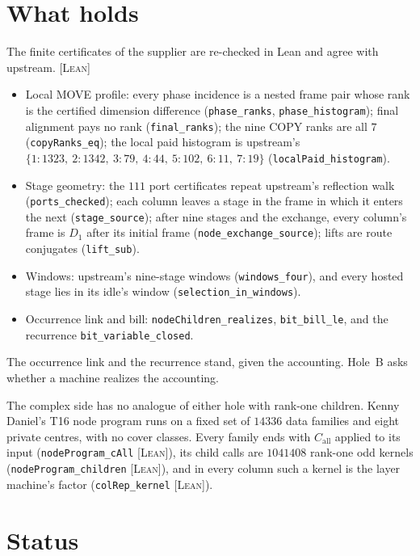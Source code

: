 \documentclass[11pt]{amsart}
\newcommand{\lean}[1]{\texttt{#1}}
\newcommand{\tagL}{\textsc{[Lean]}}
\begin{document}
\section{What holds}

The finite certificates of the supplier are re-checked in Lean and agree with upstream. \tagL{}
\begin{itemize}
\item Local MOVE profile: every phase incidence is a nested frame pair whose rank is the certified
  dimension difference (\lean{phase\_ranks}, \lean{phase\_histogram}); final alignment pays no rank
  (\lean{final\_ranks}); the nine COPY ranks are all $7$ (\lean{copyRanks\_eq}); the local paid
  histogram is upstream's $\{1{:}1323,\ 2{:}1342,\ 3{:}79,\ 4{:}44,\ 5{:}102,\ 6{:}11,\ 7{:}19\}$
  (\lean{localPaid\_histogram}).
\item Stage geometry: the $111$ port certificates repeat upstream's reflection walk
  (\lean{ports\_checked}); each column leaves a stage in the frame in which it enters the next
  (\lean{stage\_source}); after nine stages and the exchange, every column's frame is $D_1$ after its
  initial frame (\lean{node\_exchange\_source}); lifts are route conjugates (\lean{lift\_sub}).
\item Windows: upstream's nine-stage windows (\lean{windows\_four}), and every hosted stage lies in
  its idle's window (\lean{selection\_in\_windows}).
\item Occurrence link and bill: \lean{nodeChildren\_realizes}, \lean{bit\_bill\_le}, and the
  recurrence \lean{bit\_variable\_closed}.
\end{itemize}
The occurrence link and the recurrence stand, given the accounting. Hole~B asks whether a machine
realizes the accounting.

The complex side has no analogue of either hole with rank-one children. Kenny Daniel's T16 node
program runs on a fixed set of $14336$ data families and eight private centres, with no cover
classes. Every family ends with $C_{\mathrm{all}}$ applied to its input (\lean{nodeProgram\_cAll}
\tagL{}), its child calls are $1041408$ rank-one odd kernels (\lean{nodeProgram\_children}
\tagL{}), and in every column such a kernel is the layer machine's factor (\lean{colRep\_kernel}
\tagL{}).

\section{Status}
\end{document}
